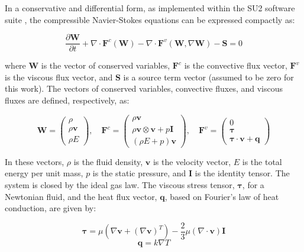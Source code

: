 \documentclass[tg, EN]{ufabcFHZh_tg}
\newcommand{\tens}[1]{\mathbf{#1}}  %
\begin{document}
In a conservative and differential form, as implemented within the SU2 software suite \citep{su2_theory}, the compressible Navier-Stokes equations can be expressed compactly as:

\begin{equation}
    \frac{\partial \mathbf{W}}{\partial t} + \nabla \cdot \mathbf{F}^c(\mathbf{W}) - \nabla \cdot \mathbf{F}^v(\mathbf{W}, \nabla \mathbf{W}) - \mathbf{S} = 0
    \label{eq:rans_compact}
\end{equation}

where $\mathbf{W}$ is the vector of conserved variables, $\mathbf{F}^c$ is the convective flux vector, $\mathbf{F}^v$ is the viscous flux vector, and $\mathbf{S}$ is a source term vector (assumed to be zero for this work). The vectors of conserved variables, convective fluxes, and viscous fluxes are defined, respectively, as:

\begin{equation}
\mathbf{W} = \begin{pmatrix} \rho \\ \rho \mathbf{v} \\ \rho E \end{pmatrix}, \quad
\mathbf{F}^c = \begin{pmatrix} \rho \mathbf{v} \\ \rho \mathbf{v} \otimes \mathbf{v} + p\tens{I} \\ (\rho E + p)\mathbf{v} \end{pmatrix}, \quad
\mathbf{F}^v = \begin{pmatrix} 0 \\ \boldsymbol{\tau} \\ \boldsymbol{\tau} \cdot \mathbf{v} + \mathbf{q} \end{pmatrix}
\end{equation}

In these vectors, $\rho$ is the fluid density, $\mathbf{v}$ is the velocity vector, $E$ is the total energy per unit mass, $p$ is the static pressure, and $\mathbf{I}$ is the identity tensor. The system is closed by the ideal gas law. The viscous stress tensor, $\boldsymbol{\tau}$, for a Newtonian fluid, and the heat flux vector, $\mathbf{q}$, based on Fourier's law of heat conduction, are given by:


\begin{equation}
\boldsymbol{\tau} = \mu \left( \nabla \mathbf{v} + (\nabla \mathbf{v})^T \right) - \frac{2}{3}\mu (\nabla \cdot \mathbf{v})\mathbf{I}
\end{equation}
\begin{equation}
\mathbf{q} = k \nabla T
\end{equation}
\end{document}
